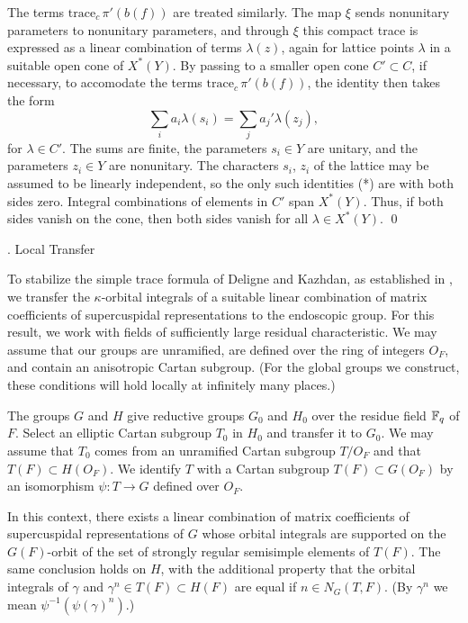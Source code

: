 The terms $\text{trace}_c\,\pi'(b(f))$ are treated
similarly.  The map $\xi$ sends nonunitary parameters to nonunitary
parameters, and through $\xi$ this compact trace is expressed as a linear
combination of terms $\lambda(z)$, again for lattice points $\lambda$
in a suitable open cone of $X^*(Y)$.
By passing to a smaller open cone $C'\subset C$, if necessary, to accomodate the
terms $\text{trace}_c\,\pi'(b(f))$, 
the identity then takes the form
    $$\sum_i a_i \lambda(s_i) = \sum_j a_j'\lambda(z_j),\tag{*}$$
for $\lambda\in C'$.
The sums are finite, the parameters $s_i\in Y$ are unitary, and
the parameters $z_i\in Y$ are nonunitary.
The characters $s_i$, $z_i$ of the lattice 
may be assumed to be linearly independent,
so
 the only such identities (*) are with both sides zero.
Integral combinations
of elements in $C'$ span $X^*(Y)$.
Thus, if both sides vanish on the cone, then both sides vanish
for all $\lambda\in X^*(Y)$.
\qed
\enddemo

. Local Transfer \endhead

To stabilize the simple trace formula of Deligne and Kazhdan,
as established in \cite{He}, we transfer the $\kappa$-orbital integrals
of a suitable linear combination of matrix coefficients of
supercuspidal representations to the endoscopic
group.  For this result, we work with fields of sufficiently
large residual characteristic.  We may assume that our groups
are unramified, are defined over the ring of integers $O_F$,
and contain an anisotropic Cartan subgroup.
(For the global groups we construct, these conditions will hold locally
at infinitely many places.)

The groups $G$ and $H$ give reductive groups $G_0$ and $H_0$
over the residue field ${\Bbb F}_q$ of $F$.  Select an elliptic Cartan
subgroup $T_0$ in $H_0$ and transfer it to $G_0$.  We may assume
that $T_0$ comes from an unramified Cartan subgroup $T/O_F$ and
that $T(F)\subset H(O_F)$. We identify $T$ with a Cartan subgroup
$T(F)\subset G(O_F)$ by an isomorphism $\psi:T\to G$ defined over
$O_F$.

  In this context, there exists a linear
combination of matrix coefficients of supercuspidal representations
of $G$ whose orbital integrals are supported on the $G(F)$-orbit
of the set of strongly regular semisimple elements of $T(F)$.
The same conclusion holds on $H$, with the additional property
that the orbital integrals of $\gamma$ and $\gamma^n\in T(F)\subset H(F)$ 
are equal if $n\in N_G(T,F)$.
(By $\gamma^n$ we mean $\psi^{-1}(\psi(\gamma)^n)$.)
\endproclaim


